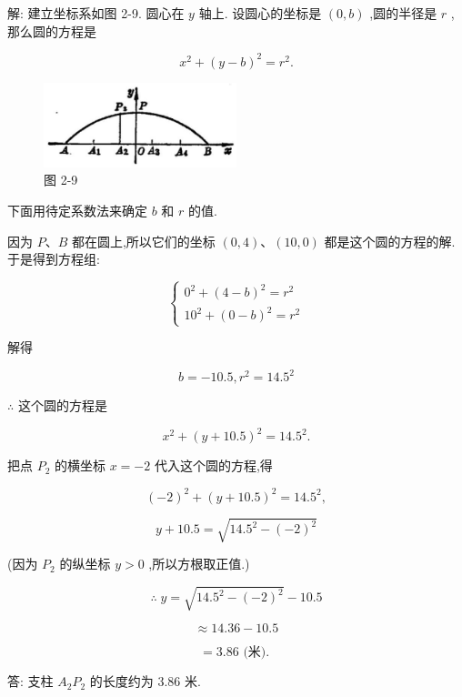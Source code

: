 \documentclass[lang=cn,newtx,10pt,scheme=chinese]{elegantbook}
\begin{document}
解: 建立坐标系如图 2-9. 圆心在 \(y\) 轴上. 设圆心的坐标是 \(\left( {0,b}\right)\) ,圆的半径是 \(r\) ,那么圆的方程是

\[
    {x}^{2} + {\left( y - b\right) }^{2} = {r}^{2}.
\]

\begin{figure}[h]
  \centering
  \includegraphics[max width=0.5\textwidth]{images/01912cc2-ffb6-728e-9ae7-b113ff05c64b_80_540621.jpg}
  \caption{图 2-9}
\end{figure}



下面用待定系数法来确定 \(b\) 和 \(r\) 的值.

因为 \(P\text{、}B\) 都在圆上,所以它们的坐标 \(\left( {0,4}\right) \text{、}\left( {{10},0}\right)\) 都是这个圆的方程的解. 于是得到方程组:

\[
  \left\{ \begin{array}{l} {0}^{2} + {\left( 4 - b\right) }^{2} = {r}^{2} \\ {10}^{2} + {\left( 0 - b\right) }^{2} = {r}^{2} \end{array}\right.
\]

解得

\[
  b = - {10.5},{r}^{2} = {14.5}^{2}
\]

\(\therefore\) 这个圆的方程是

\[
    {x}^{2} + {\left( y + {10.5}\right) }^{2} = {14.5}^{2}.
\]

把点 \({P}_{2}\) 的横坐标 \(x = - 2\) 代入这个圆的方程,得

\[
    {\left( -2\right) }^{2} + {\left( y + {10.5}\right) }^{2} = {14.5}^{2},
\]

\[
  y + {10.5} = \sqrt{{14.5}^{2} - {\left( -2\right) }^{2}}
\]

(因为 \({P}_{2}\) 的纵坐标 \(y > 0\) ,所以方根取正值.)

\[
  \therefore \;y = \sqrt{{14.5}^{2} - {\left( -2\right) }^{2}} - {10.5}
\]

\[
  \approx {14.36} - {10.5}
\]

\[
  = {3.86}\text{ (米). }
\]

答: 支柱 \({A}_{2}{P}_{2}\) 的长度约为 3.86 米.
\end{document}
